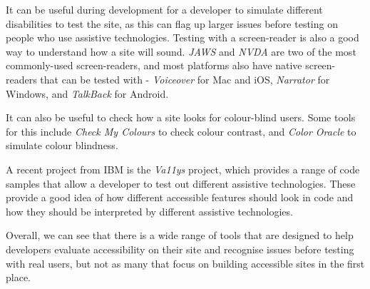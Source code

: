 \documentclass[ %
                    author={Aleena Baig},
                supervisor={Dr Simon Lock},
                    degree={BSc},
                     title={On Making Web Accessible Graphs},
                  subtitle={},
                      year={2019} ]{dissertation}
\begin{document}
It can be useful during development for a developer to simulate different disabilities to test the site, as this can flag up larger issues before testing on people who use assistive technologies. Testing with a screen-reader is also a good way to understand how a site will sound. \textit{JAWS} and \textit{NVDA} are two of the most commonly-used screen-readers, and most platforms also have native screen-readers that can be tested with - \textit{Voiceover} for Mac and iOS, \textit{Narrator} for Windows, and \textit{TalkBack} for Android.

It can also be useful to check how a site looks for colour-blind users. Some tools for this include \textit{Check My Colours} to check colour contrast, and \textit{Color Oracle} to simulate colour blindness.

A recent project from IBM is the \textit{Va11ys} project, which provides a range of code samples that allow a developer to test out different assistive technologies. These provide a good idea of how different accessible features should look in code and how they should be interpreted by different assistive technologies.

Overall, we can see that there is a wide range of tools that are designed to help developers evaluate accessibility on their site and recognise issues before testing with real users, but not as many that focus on building accessible sites in the first place.
\end{document}
